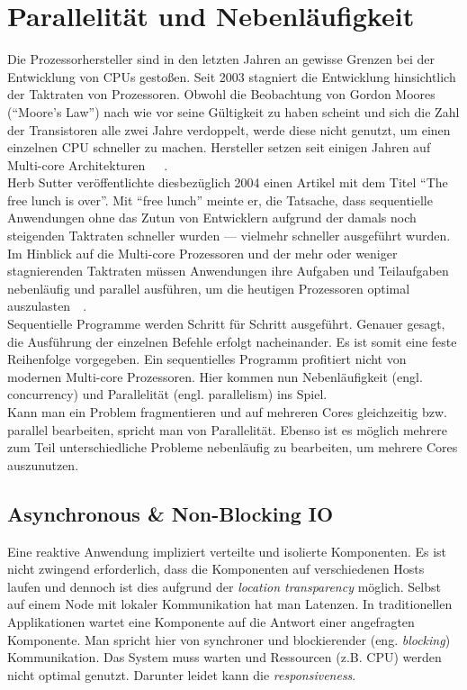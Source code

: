 \pagebreak

\section{Parallelität und Nebenläufigkeit}
Die Prozessorhersteller sind in den letzten Jahren an gewisse Grenzen bei der Entwicklung von CPUs gestoßen. Seit 2003 stagniert die Entwicklung hinsichtlich der Taktraten von Prozessoren. Obwohl die Beobachtung von Gordon Moores (\enquote{Moore's Law}) nach wie vor seine Gültigkeit zu haben scheint und sich die Zahl der Transistoren alle zwei Jahre verdoppelt, werde diese nicht genutzt, um einen einzelnen CPU schneller zu machen. Hersteller setzen seit einigen Jahren auf Multi-core Architekturen~\cite[S.~1]{butcher_seven_2014}~\cite[S.~108]{vernon_reactive_2016}~\cite{sutter_free_2004}.\\
Herb Sutter veröffentlichte diesbezüglich 2004 einen Artikel mit dem Titel \enquote{The free lunch is over}. Mit \enquote{free lunch} meinte er, die Tatsache, dass sequentielle Anwendungen ohne das Zutun von Entwicklern aufgrund der damals noch steigenden Taktraten schneller wurden --- vielmehr schneller ausgeführt wurden. Im Hinblick auf die Multi-core Prozessoren und der mehr oder weniger stagnierenden Taktraten müssen Anwendungen ihre Aufgaben und Teilaufgaben nebenläufig und parallel ausführen, um die heutigen Prozessoren optimal auszulasten~\cite{sutter_free_2004}~\cite[S.~1]{butcher_seven_2014}.\\

Sequentielle Programme werden Schritt für Schritt ausgeführt. Genauer gesagt, die Ausführung der einzelnen Befehle erfolgt nacheinander. Es ist somit eine feste Reihenfolge vorgegeben. Ein sequentielles Programm profitiert nicht von modernen Multi-core Prozessoren. Hier kommen nun Nebenläufigkeit (engl. concurrency) und Parallelität (engl. parallelism) ins Spiel.\\
Kann man ein Problem fragmentieren und auf mehreren Cores gleichzeitig bzw. parallel bearbeiten, spricht man von Parallelität. Ebenso ist es möglich mehrere zum Teil unterschiedliche Probleme nebenläufig zu bearbeiten, um mehrere Cores auszunutzen.

\pagebreak

\subsection{Asynchronous \& Non-Blocking IO}
Eine reaktive Anwendung impliziert verteilte und isolierte Komponenten. Es ist nicht zwingend erforderlich, dass die Komponenten auf verschiedenen Hosts laufen und dennoch ist dies aufgrund der \textit{location transparency} möglich. Selbst auf einem Node mit lokaler Kommunikation hat man Latenzen. In traditionellen Applikationen wartet eine Komponente auf die Antwort einer angefragten Komponente. Man spricht hier von synchroner und blockierender (eng. \textit{blocking}) Kommunikation. Das System muss warten und Ressourcen (z.B. CPU) werden nicht optimal genutzt. Darunter leidet kann die \textit{responsiveness}.

